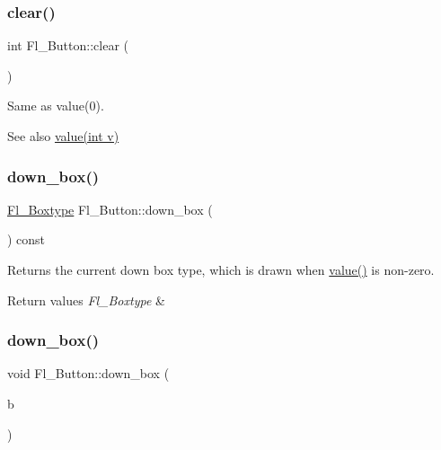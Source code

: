 \subsubsection{\texorpdfstring{clear()}{clear()}}
{\footnotesize\ttfamily int Fl\+\_\+\+Button\+::clear (\begin{DoxyParamCaption}{ }\end{DoxyParamCaption})\hspace{0.3cm}{\ttfamily [inline]}}

Same as {\ttfamily value(0)}. \begin{DoxySeeAlso}{See also}
\hyperlink{class_fl___button_aceffc03f6b14f180a1639e26c91f9a4a}{value(int v)} 
\end{DoxySeeAlso}
\mbox{\label{class_fl___button_ae5e15aced7a8dba0435f0751d0a2ce37}} 
\subsubsection{\texorpdfstring{down\+\_\+box()}{down\_box()}\hspace{0.1cm}{\footnotesize\ttfamily [1/2]}}
{\footnotesize\ttfamily \hyperlink{_enumerations_8_h_ae48bf9070f8541de17829f54ccacc6bc}{Fl\+\_\+\+Boxtype} Fl\+\_\+\+Button\+::down\+\_\+box (\begin{DoxyParamCaption}{ }\end{DoxyParamCaption}) const\hspace{0.3cm}{\ttfamily [inline]}}

Returns the current down box type, which is drawn when \hyperlink{class_fl___button_aceffc03f6b14f180a1639e26c91f9a4a}{value()} is non-\/zero. 
\begin{DoxyRetVals}{Return values}
{\em Fl\+\_\+\+Boxtype} & \\
\hline
\end{DoxyRetVals}
\mbox{\label{class_fl___button_a970d494d8fefcfd73308354ebba14b8f}} 
\subsubsection{\texorpdfstring{down\+\_\+box()}{down\_box()}\hspace{0.1cm}{\footnotesize\ttfamily [2/2]}}
{\footnotesize\ttfamily void Fl\+\_\+\+Button\+::down\+\_\+box (\begin{DoxyParamCaption}\item[{\hyperlink{_enumerations_8_h_ae48bf9070f8541de17829f54ccacc6bc}{Fl\+\_\+\+Boxtype}}]{b }\end{DoxyParamCaption})\hspace{0.3cm}{\ttfamily [inline]}}

